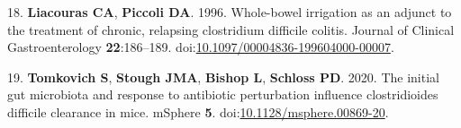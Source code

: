 \documentclass[
  11pt,
]{article}
\begin{document}
\leavevmode\hypertarget{ref-Liacouras1996}{}%
18. \textbf{Liacouras CA}, \textbf{Piccoli DA}. 1996. Whole-bowel
irrigation as an adjunct to the treatment of chronic, relapsing
clostridium difficile colitis. Journal of Clinical Gastroenterology
\textbf{22}:186--189.
doi:\href{https://doi.org/10.1097/00004836-199604000-00007}{10.1097/00004836-199604000-00007}.

\leavevmode\hypertarget{ref-Tomkovich2020}{}%
19. \textbf{Tomkovich S}, \textbf{Stough JMA}, \textbf{Bishop L},
\textbf{Schloss PD}. 2020. The initial gut microbiota and response to
antibiotic perturbation influence clostridioides difficile clearance in
mice. mSphere \textbf{5}.
doi:\href{https://doi.org/10.1128/msphere.00869-20}{10.1128/msphere.00869-20}.
\end{document}
